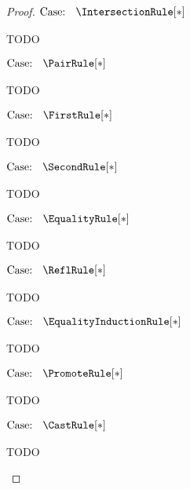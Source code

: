 \begin{proof}
$\text{Case: }\begin{array}{c} \IntersectionRule[*] \end{array}$
\begin{proofcase}
    TODO
\end{proofcase}

$\text{Case: }\begin{array}{c} \PairRule[*] \end{array}$
\begin{proofcase}
    TODO
\end{proofcase}

$\text{Case: }\begin{array}{c} \FirstRule[*] \end{array}$
\begin{proofcase}
    TODO
\end{proofcase}

$\text{Case: }\begin{array}{c} \SecondRule[*] \end{array}$
\begin{proofcase}
    TODO
\end{proofcase}

$\text{Case: }\begin{array}{c} \EqualityRule[*] \end{array}$
\begin{proofcase}
    TODO
\end{proofcase}

$\text{Case: }\begin{array}{c} \ReflRule[*] \end{array}$
\begin{proofcase}
    TODO
\end{proofcase}

$\text{Case: }\begin{array}{c} \EqualityInductionRule[*] \end{array}$
\begin{proofcase}
    TODO
\end{proofcase}

$\text{Case: }\begin{array}{c} \PromoteRule[*] \end{array}$
\begin{proofcase}
    TODO
\end{proofcase}

$\text{Case: }\begin{array}{c} \CastRule[*] \end{array}$
\begin{proofcase}
    TODO
\end{proofcase}


\end{proof}

